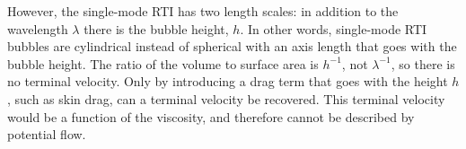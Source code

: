 However, the single-mode RTI has two length scales: in addition to the wavelength $\lambda$ there is the bubble height, $h$.
In other words, single-mode RTI bubbles are cylindrical instead of spherical with an axis length that goes with the bubble height.
The ratio of the volume to surface area is $h^{-1}$, not $\lambda^{-1}$, so there is no terminal velocity.
Only by introducing a drag term that goes with the height $h$, such as skin drag, can a terminal velocity be recovered.
This terminal velocity would be a function of the viscosity, and therefore cannot be described by potential flow.


